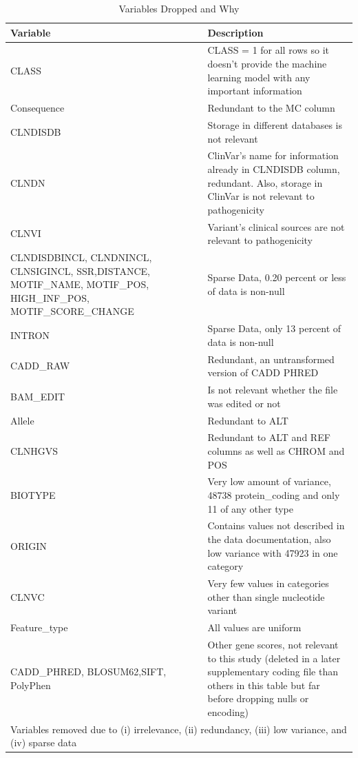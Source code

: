 \documentclass[journal,two side,web]{ieeecolor}
\begin{document}
\clearpage
\begin{table}
\caption{Variables Dropped and Why}
\label{table}
\setlength{\tabcolsep}{3pt}
\begin{tabular}{|p{75pt}|p{140pt}|}
\hline
Variable& 
Description\\
\hline
CLASS & 
CLASS = 1 for all rows so it doesn’t provide the machine learning model with any important information  \\
\hline
Consequence & 
Redundant to the MC column \\
\hline
CLNDISDB & 
Storage in different databases is not relevant \\
\hline
CLNDN & 
ClinVar’s name for information already in CLNDISDB column, redundant. Also, storage in ClinVar is not relevant to pathogenicity  \\
\hline
CLNVI & 
Variant’s clinical sources are not relevant to pathogenicity \\
\hline
CLNDISDBINCL, CLNDNINCL, CLNSIGINCL, SSR,DISTANCE, MOTIF\_NAME, MOTIF\_POS, HIGH\_INF\_POS, MOTIF\_SCORE\_CHANGE & 
Sparse Data,  0.20 percent or less  of data is non-null \\
\hline
INTRON & 
Sparse Data, only 13 percent of data is non-null \\
\hline
CADD\_RAW & 
Redundant, an untransformed version of CADD PHRED \\
\hline
BAM\_EDIT & 
Is not relevant whether the file was edited or not\\
\hline
Allele & 
Redundant to ALT \\
\hline
CLNHGVS & 
Redundant to ALT and REF columns as well as CHROM and POS \\
\hline
BIOTYPE& 
Very low amount of variance, 48738 protein\_coding and only 11 of any other type \\
\hline
ORIGIN& 
Contains values not described in the data documentation, also low variance with 47923 in one category \\
\hline
CLNVC& 
Very few values in categories other than single nucleotide variant \\
\hline
Feature\_type& 
All values are uniform \\
\hline
CADD\_PHRED, BLOSUM62,SIFT, PolyPhen&
Other gene scores, not relevant to this study (deleted in a later supplementary coding file than others in this table but far before dropping nulls or encoding)
\\
\hline
\multicolumn{2}{p{215pt}}{Variables removed due to (i) irrelevance, (ii) redundancy, (iii) low variance, and (iv) sparse data}\\
\end{tabular}
\label{tab1}
\end{table}
\end{document}
